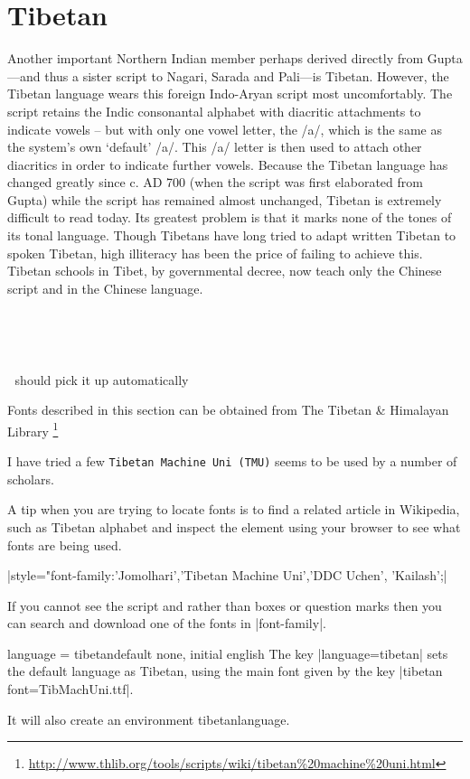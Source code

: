 \section{Tibetan}
\label{tibetan}


Another important Northern Indian member perhaps
derived directly from Gupta---and thus a sister script to Nagari,
Sarada and Pali---is Tibetan. However, the Tibetan
language wears this foreign Indo-Aryan script most uncomfortably.\cite{writing}
The script retains the Indic consonantal alphabet with diacritic
attachments to indicate vowels – but with only one vowel
letter, the /a/, which is the same as the system’s own ‘default’ /a/.
This /a/ letter is then used to attach other diacritics in order to
indicate further vowels. Because the Tibetan language has
changed greatly since c. AD 700 (when the script was first elaborated
from Gupta) while the script has remained almost
unchanged, Tibetan is extremely difficult to read today. Its
greatest problem is that it marks none of the tones of its tonal
language. Though Tibetans have long tried to adapt written
Tibetan to spoken Tibetan, high illiteracy has been the price of
failing to achieve this. Tibetan schools in Tibet, by governmental
decree, now teach only the Chinese script and in the Chinese
language.

^^A\newfontfamily{}

^^A\newfontfamily{}

^^A should pick it up automatically \tibetan

Fonts described in this section can be obtained from The Tibetan \& Himalayan Library
\footnote{\url{http://www.thlib.org/tools/scripts/wiki/tibetan\%20machine\%20uni.html}  }

I have tried a few \texttt{Tibetan Machine Uni (TMU)} seems to be used by a number of scholars. 

A tip when you are trying to locate fonts is to find a related article in Wikipedia, such as Tibetan alphabet and inspect the element using your browser to see what fonts are being used.


|style="font-family:'Jomolhari','Tibetan Machine Uni','DDC Uchen', 'Kailash';| 


If you cannot see the script and rather than boxes or question marks then you can search and download one of the fonts in |font-family|.



\begin{docKey}[phd]{language}{ = tibetan}{default none, initial english} 
The key |language=tibetan| sets the default language as Tibetan, using the main font given by the key |tibetan font=TibMachUni.ttf|.

It will also create an environment tibetanlanguage.
\end{docKey}

